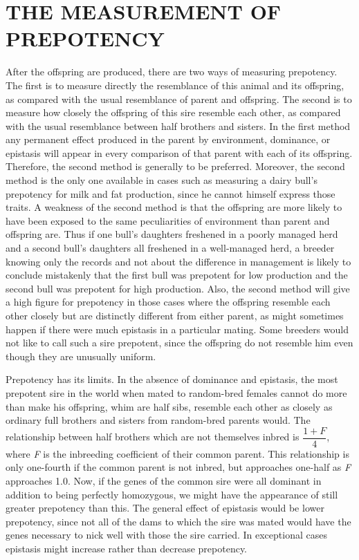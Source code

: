 \section*{THE MEASUREMENT OF PREPOTENCY}

After the offspring are produced, there are two ways of measuring
prepotency. The first is to measure directly the resemblance of this
animal and its offspring, as compared with the usual resemblance of parent
and offspring. The second is to measure how closely the offspring of
this sire resemble each other, as compared with the usual resemblance
between half brothers and sisters. In the first method any permanent
effect produced in the parent by environment, dominance, or epistasis
will appear in every comparison of that parent with each of its offspring.
Therefore, the second method is generally to be preferred.
Moreover, the second method is the only one available in cases such as
measuring a dairy bull's prepotency for milk and fat production, since
he cannot himself express those traits. A weakness of the second method
is that the offspring are more likely to have been exposed to the same
peculiarities of environment than parent and offspring are. Thus if one
bull's daughters freshened in a poorly managed herd and a second bull's
daughters all freshened in a well-managed herd, a breeder knowing
only the records and not about the difference in management is likely
to conclude mistakenly that the first bull was prepotent for low production
and the second bull was prepotent for high production. Also, the
second method will give a high figure for prepotency in those cases
where the offspring resemble each other closely but are distinctly different
from either parent, as might sometimes happen if there were much
epistasis in a particular mating. Some breeders would not like to call
such a sire prepotent, since the offspring do not resemble him even
though they are unusually uniform.

Prepotency has its limits. In the absence of dominance and epistasis,
the most prepotent sire in the world when mated to random-bred
females cannot do more than make his offspring, whim are half sibs,
resemble each other as closely as ordinary full brothers and sisters from
random-bred parents would. The relationship between half brothers
which are not themselves inbred is $\dfrac{1 + F}{4}$, where \textit{F} is the
inbreeding coefficient of their common parent. This relationship is only one-fourth
if the common parent is not inbred, but approaches one-half as \textit{F}
approaches 1.0. Now, if the genes of the common sire were all dominant
in addition to being perfectly homozygous, we might have the appearance
of still greater prepotency than this. The general effect of epistasis
would be lower prepotency, since not all of the dams to which the sire
was mated would have the genes necessary to nick well with those the
sire carried. In exceptional cases epistasis might increase rather than
decrease prepotency.

